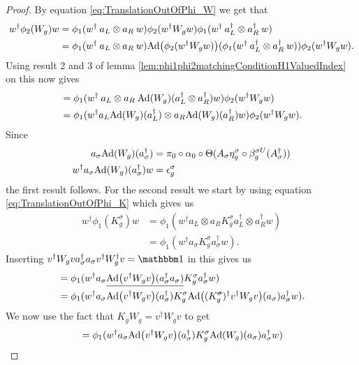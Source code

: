 \documentclass[12pt,a4paper,twoside]{article}
\numberwithin{equation}{section}
\begin{document}
\begin{proof}
	By equation \eqref{eq:TranslationOutOfPhi_W} we get that
	\begin{align}
		w^\dagger\phi_2(W_g)w&=\phi_1(w^\dagger \: a_L\otimes a_R \: w)\phi_2(w^\dagger W_g w)\phi_1(w^\dagger \: a_L^\dagger\otimes a_R^\dagger \: w)\\
		&=\phi_1(w^\dagger \: a_L\otimes a_R \: w)\Ad{\phi_2(w^\dagger W_g w)}(\phi_1(w^\dagger \: a_L^\dagger\otimes a_R^\dagger \: w))\phi_2(w^\dagger W_g w).
	\end{align}
	Using result 2 and 3 of lemma \ref{lem:phi1phi2matchingConditionH1ValuedIndex} on this now gives
	\begin{align}
		&=\phi_1(w^\dagger \: a_L\otimes a_R \:\Ad{W_g}(a_L^\dagger\otimes a_R^\dagger)w)\phi_2(w^\dagger W_g w)\\
		&=\phi_1(w^\dagger a_L\Ad{W_g}(a_L^\dagger)\otimes a_R \Ad{W_g}( a_R^\dagger)w)\phi_2(w^\dagger W_g w).
	\end{align}
	Since
	\begin{align}
		a_\sigma\Ad{W_g}(a_\sigma^\dagger)&=\pi_0\circ\alpha_0\circ\Theta(A_\sigma\eta_g^\sigma\circ\beta_g^{\sigma U}(A_\sigma^\dagger))\\
		w^\dagger a_\sigma\Ad{W_g}(a_\sigma^\dagger)w&=\epsilon_g^\sigma
	\end{align}
	the first result follows. For the second result we start by using equation \eqref{eq:TranslationOutOfPhi_K} which gives us
	\begin{align}
		w^\dagger \phi_1(K_g^\sigma)w&=\phi_1(w^\dagger a_L\otimes a_R K_g^\sigma a_L^\dagger\otimes a_R^\dagger w)\\
		&=\phi_1(w^\dagger a_\sigma K_g^\sigma a_\sigma^\dagger w).
	\end{align}
	Inserting $v^\dagger W_g va_\sigma^\dagger a_\sigma v^\dagger W_g^\dagger v=\id$ in this gives us
	\begin{align}
		&=\phi_1(w^\dagger a_\sigma \underline{\Ad{v^\dagger W_g v}(a_\sigma^\dagger a_\sigma)} K_g^\sigma a_\sigma^\dagger w)\\
		&=\phi_1(w^\dagger a_\sigma \Ad{v^\dagger W_g v}(a_\sigma^\dagger)K_g^\sigma  \Ad{(K_g^\stkout{\sigma})^\dagger v^\dagger W_g v}(a_\sigma) a_\sigma^\dagger w).
	\end{align}
	We now use the fact that $K_g W_g=v^\dagger W_g v$ to get
	\begin{align}
		&=\phi_1(w^\dagger a_\sigma \Ad{v^\dagger W_g v}(a_\sigma^\dagger)K_g^\sigma  \Ad{W_g}(a_\sigma) a_\sigma^\dagger w)\\

\end{align}
\end{proof}
\end{document}
